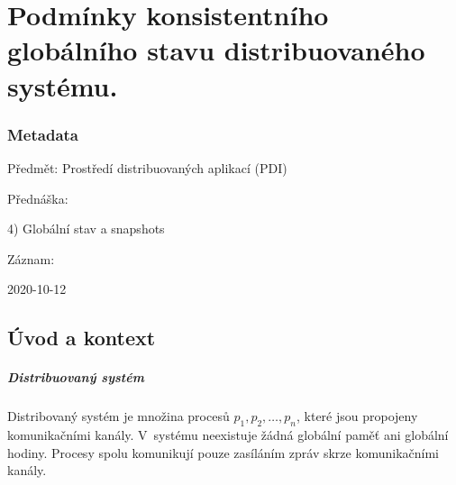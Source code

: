 

\graphicspath{{pdi/konzistentni_globalni_stav}}


\chapter{Podmínky konsistentního globálního stavu distribuovaného systému.}



\subsection*{Metadata}

\begin{compactitem}
    \item Předmět: Prostředí distribuovaných aplikací (PDI)
    \item Přednáška:
    \begin{compactitem}
        \item 4) Globální stav a snapshots
    \end{compactitem}
    \item Záznam:
    \begin{compactitem}
        \item 2020-10-12
    \end{compactitem}
\end{compactitem}


\section{Úvod a kontext}

\paragraph*{Distribuovaný systém} Distribovaný systém je množina procesů $p_1, p_2, \dots, p_n$, které jsou propojeny komunikačními kanály. V~systému neexistuje žádná globální paměť ani globální hodiny. Procesy spolu komunikují pouze zasíláním zpráv skrze komunikačními kanály.

